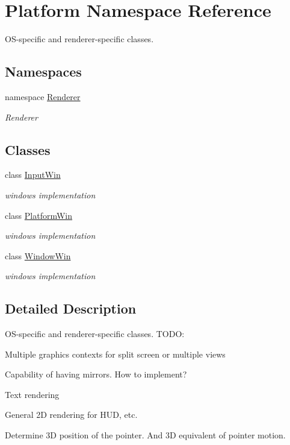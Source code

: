 \hypertarget{namespacePlatform}{
\section{Platform Namespace Reference}
\label{namespacePlatform}
}


OS-\/specific and renderer-\/specific classes.  
\subsection*{Namespaces}
\begin{DoxyCompactItemize}
\item 
namespace \hyperlink{namespacePlatform_1_1Renderer}{Renderer}


\begin{DoxyCompactList}\small\item\em Renderer \item\end{DoxyCompactList}\end{DoxyCompactItemize}
\subsection*{Classes}
\begin{DoxyCompactItemize}
\item 
class \hyperlink{classPlatform_1_1InputWin}{InputWin}
\begin{DoxyCompactList}\small\item\em windows implementation \item\end{DoxyCompactList}\item 
class \hyperlink{classPlatform_1_1PlatformWin}{PlatformWin}
\begin{DoxyCompactList}\small\item\em windows implementation \item\end{DoxyCompactList}\item 
class \hyperlink{classPlatform_1_1WindowWin}{WindowWin}
\begin{DoxyCompactList}\small\item\em windows implementation \item\end{DoxyCompactList}\end{DoxyCompactItemize}


\subsection{Detailed Description}
OS-\/specific and renderer-\/specific classes. TODO:
\begin{DoxyItemize}
\item Multiple graphics contexts for split screen or multiple views
\item Capability of having mirrors. How to implement?
\item Text rendering
\item General 2D rendering for HUD, etc.
\item Determine 3D position of the pointer. And 3D equivalent of pointer motion. 
\end{DoxyItemize}